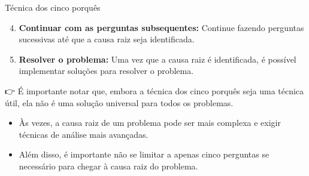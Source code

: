\documentclass[
  ignorenonframetext,
  aspectratio=169,
]{beamer}
\providecommand{\tightlist}{%
  \setlength{\itemsep}{0pt}\setlength{\parskip}{0pt}}
\begin{document}
\begin{frame}{Técnica dos cinco porquês}
\label{tuxe9cnica-dos-cinco-porquuxeas-2}
\begin{enumerate}
\setcounter{enumi}{3}
\tightlist
\item
  \textbf{Continuar com as perguntas subsequentes:} Continue fazendo
  perguntas sucessivas até que a causa raiz seja identificada.
\end{enumerate}

\pause

\begin{enumerate}
\setcounter{enumi}{4}
\tightlist
\item
  \textbf{Resolver o problema:} Uma vez que a causa raiz é identificada,
  é possível implementar soluções para resolver o problema.
\end{enumerate}

\pause

{👉} É importante notar que, embora a técnica dos cinco porquês seja uma
técnica útil, ela não é uma solução universal para todos os problemas.

\begin{itemize}
\tightlist
\item
  Às vezes, a causa raiz de um problema pode ser mais complexa e exigir
  técnicas de análise mais avançadas.
\item
  Além disso, é importante não se limitar a apenas cinco perguntas se
  necessário para chegar à causa raiz do problema.
\end{itemize}
\end{frame}
\end{document}
